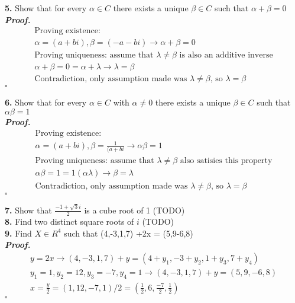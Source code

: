 \documentclass[12pt]{article} %
\newenvironment{solution}[1][\it{Proof}]{\textbf{#1. } }{$\square$}
\begin{document}
\textbf{5.} Show that for every $\alpha \in C$ there exists a unique $\beta \in C$ such that $\alpha + \beta = 0$ \\ 

\begin{solution}
\begin{align*}
    &\text{Proving existence: } & \\
    &\alpha = (a+bi), \beta = (-a-bi) \rightarrow \alpha + \beta = 0 & \\
    &\text{Proving uniqueness: assume that $\lambda \ne \beta$ is also an additive inverse} & \\
    &\alpha + \beta = 0 = \alpha + \lambda \rightarrow \lambda = \beta & \\
    &\text{Contradiction, only assumption made was $\lambda \ne \beta$, so $\lambda = \beta$ }
\end{align*}
\end{solution}

\textbf{6.} Show that for every $\alpha \in C$ with $\alpha \ne 0$ there exists a unique $\beta \in C$ such that $\alpha\beta = 1$ \\ 

\begin{solution}
\begin{align*}
    &\text{Proving existence: } & \\
    &\alpha = (a+bi), \beta = \frac{1}{(a+bi} \rightarrow \alpha\beta = 1 & \\
    &\text{Proving uniqueness: assume that $\lambda \ne \beta$ also satisies this property} & \\
    &\alpha\beta = 1 = 1(\alpha\lambda) \rightarrow \beta = \lambda & \\
    &\text{Contradiction, only assumption made was $\lambda \ne \beta$, so $\lambda = \beta$ }
\end{align*}
\end{solution}

\textbf{7.} Show that $\frac{-1 + \sqrt{3}i}{2}$ is a cube root of 1 (TODO) \\ 

\textbf{8.} Find two distinct square roots of $i$ (TODO) \\

\textbf{9.} Find $X \in R^4$ such that (4,-3,1,7) +2x = (5,9-6,8) \\ 

\begin{solution}
\begin{align*}
    & y = 2x \rightarrow (4,-3,1,7) + y = (4+y_1,-3+y_2,1+y_3,7+y_4) & \\
    & y_1 = 1, y_2 = 12, y_3 = -7, y_4 = 1 \rightarrow (4,-3,1,7) + y = (5,9,-6,8) & \\
    & x = \frac{y}{2} = (1,12,-7,1)/2 = (\frac{1}{2},6,\frac{-7}{2},\frac{1}{2}) & 
\end{align*}
\end{solution}
\end{document}
